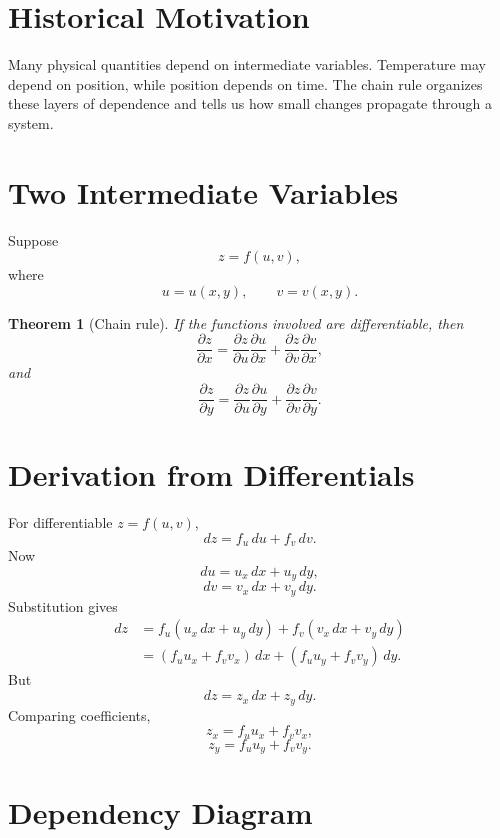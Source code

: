 \documentclass[11pt,oneside]{book}
\theoremstyle{studentthm}
\newtheorem{theorem}{Theorem}[chapter]
\theoremstyle{definition}
\newcommand{\pd}[2]{\frac{\partial #1}{\partial #2}}
\begin{document}
\section*{Historical Motivation}

Many physical quantities depend on intermediate variables.
Temperature may depend on position, while position depends on time.
The chain rule organizes these layers of dependence and tells us how
small changes propagate through a system.

\section{Two Intermediate Variables}

Suppose
\[
z=f(u,v),
\]
where
\[
u=u(x,y),
\qquad
v=v(x,y).
\]

\begin{theorem}[Chain rule]
If the functions involved are differentiable, then
\[
\pd{z}{x}
=
\pd{z}{u}\pd{u}{x}
+
\pd{z}{v}\pd{v}{x},
\]
and
\[
\pd{z}{y}
=
\pd{z}{u}\pd{u}{y}
+
\pd{z}{v}\pd{v}{y}.
\]
\end{theorem}

\section{Derivation from Differentials}

For differentiable \(z=f(u,v)\),
\[
dz=f_u\,du+f_v\,dv.
\]
Now
\[
du=u_x\,dx+u_y\,dy,
\]
\[
dv=v_x\,dx+v_y\,dy.
\]
Substitution gives
\[
\begin{aligned}
dz
&=
f_u(u_x\,dx+u_y\,dy)
+
f_v(v_x\,dx+v_y\,dy)\\
&=
(f_u u_x+f_v v_x)\,dx
+
(f_u u_y+f_v v_y)\,dy.
\end{aligned}
\]
But
\[
dz=z_x\,dx+z_y\,dy.
\]
Comparing coefficients,
\[
z_x=f_u u_x+f_v v_x,
\]
\[
z_y=f_u u_y+f_v v_y.
\]

\section{Dependency Diagram}

\begin{center}
\end{center}
\end{document}

